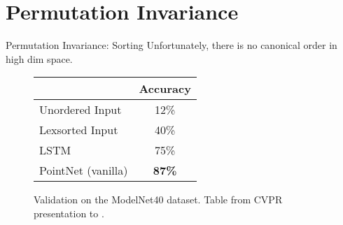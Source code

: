 \section{Permutation Invariance}
\begin{frame}[c]{Permutation Invariance: Sorting}
    \Large
    Unfortunately, there is no canonical order in high dim space.
    \begin{figure}
        \begin{tabular}{l|c}
            & Accuracy \\ \hline
            Unordered Input & 12\% \\
            Lexsorted Input & 40\% \\
            LSTM & 75\% \\
            PointNet (vanilla) & \textbf{87\%} \\
        \end{tabular}
        \caption{Validation on the ModelNet40 dataset. Table from CVPR presentation to \cite{qi2017pointnet}.}
    \end{figure}
\end{frame}

%

%


